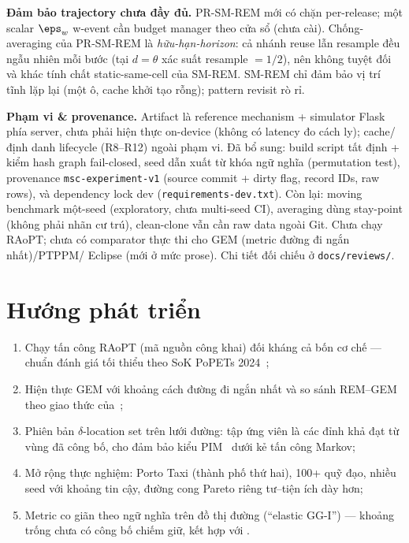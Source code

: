 \textbf{Đảm bảo trajectory chưa đầy đủ.} PR-SM-REM mới có chặn per-release; một
scalar $\eps_w$ w-event cần budget manager theo cửa sổ (chưa cài). Chống-averaging
của PR-SM-REM là \emph{hữu-hạn-horizon}: cả nhánh reuse lẫn resample đều ngẫu nhiên
mỗi bước (tại $d{=}\theta$ xác suất resample $=1/2$), nên không tuyệt đối và khác
tính chất static-same-cell của SM-REM. SM-REM chỉ đảm bảo vị trí tĩnh lặp lại (một
ô, cache khởi tạo rỗng); pattern revisit rò rỉ.

\textbf{Phạm vi \& provenance.} Artifact là reference mechanism + simulator Flask
phía server, chưa phải hiện thực on-device (không có latency đo cách ly);
cache/định danh lifecycle (R8--R12) ngoài phạm vi. Đã bổ sung: build script tất
định + kiểm hash graph fail-closed, seed dẫn xuất từ khóa ngữ nghĩa (permutation
test), provenance \texttt{msc-experiment-v1} (source commit + dirty flag, record
IDs, raw rows), và dependency lock dev (\texttt{requirements-dev.txt}). Còn lại:
moving benchmark một-seed (exploratory, chưa multi-seed CI), averaging dùng
stay-point (không phải nhãn cư trú), clean-clone vẫn cần raw data ngoài Git. Chưa
chạy RAoPT; chưa có comparator thực thi cho GEM (metric đường đi ngắn nhất)/PTPPM/
Eclipse (mới ở mức prose). Chi tiết đối chiếu ở \texttt{docs/reviews/}.

\section{Hướng phát triển}

\begin{enumerate}
  \item Chạy tấn công RAoPT (mã nguồn công khai) đối kháng cả bốn cơ chế ---
  chuẩn đánh giá tối thiểu theo SoK PoPETs 2024~\cite{buchholz2024sok};
  \item Hiện thực GEM với khoảng cách đường đi ngắn nhất và so sánh REM--GEM
  theo giao thức của~\cite{takagi2019geo};
  \item Phiên bản $\delta$-location set trên lưới đường: tập ứng viên là các
  đỉnh khả đạt từ vùng đã công bố, cho đảm bảo kiểu PIM~\cite{xiao2015protecting}
  dưới kẻ tấn công Markov;
  \item Mở rộng thực nghiệm: Porto Taxi (thành phố thứ hai), 100+ quỹ đạo,
  nhiều seed với khoảng tin cậy, đường cong Pareto riêng tư--tiện ích dày hơn;
  \item Metric co giãn theo ngữ nghĩa trên đồ thị đường (``elastic GG-I'') ---
  khoảng trống chưa có công bố chiếm giữ, kết hợp
  \cite{chatzikokolakis2015elastic} với \cite{takagi2019geo}.
\end{enumerate}
